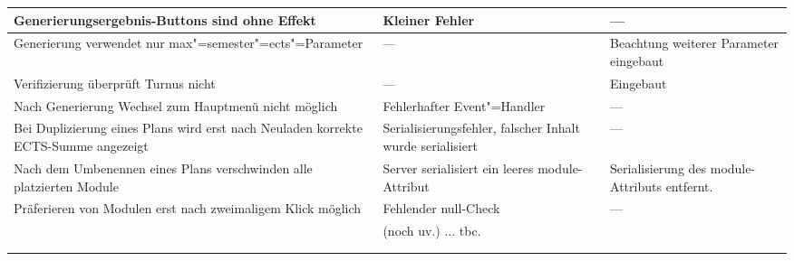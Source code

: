 \begin{longtable}{| >{\hspace{0pt}} p{} | >{\hspace{0pt}} p{} | >{\hspace{0pt}} p{} | }
	Generierungsergebnis-Buttons sind ohne Effekt & Kleiner Fehler  & --- \\
	\hline
	Generierung verwendet nur max"=semester"=ects"=Parameter & --- & Beachtung weiterer Parameter eingebaut \\
	\hline
	Verifizierung überprüft Turnus nicht & --- & Eingebaut \\
	\hline
	Nach Generierung Wechsel zum Hauptmenü nicht möglich & Fehlerhafter Event"=Handler & --- \\
	\hline
	Bei Duplizierung eines Plans wird erst nach Neuladen korrekte ECTS-Summe angezeigt & Serialisierungsfehler, falscher Inhalt wurde serialisiert & --- \\
	\hline
	Nach dem Umbenennen eines Plans verschwinden alle platzierten Module & Server serialisiert ein leeres module-Attribut & Serialisierung des module-Attributs entfernt. \\
	\hline
	Präferieren von Modulen erst nach zweimaligem Klick möglich & Fehlender null-Check & --- \\
	\hline
	& (noch uv.) ... tbc. & \\
	\hline
	
	
	
	
	& & \\
	\hline
	\hhline{|=|=|=|}
\end{longtable}